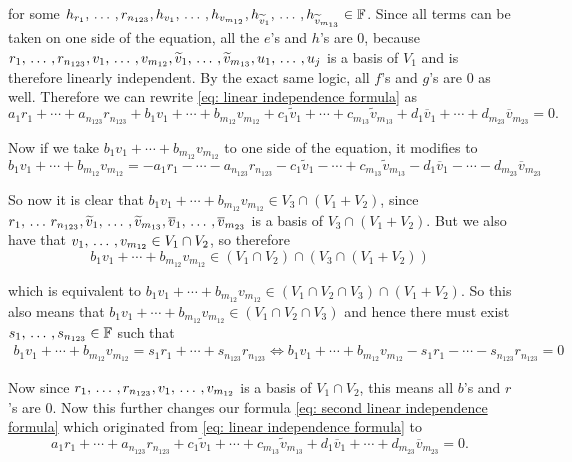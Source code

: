 \begin{xrcs}
  for some $h_{r_{1}}, {\, \ldots \,\,}, r_{n_{123}}, h_{v_{1}}, {\, \ldots \,\,}, h_{v_{m_{12}}}, h_{\widetilde{v}_1}, {\, \ldots \,\,},  h_{\widetilde{v}_{m_{13}}}  \in \mathbb{F}$. Since all terms can be taken on one side of the equation, all the $e$'s and $h$'s are $0$, because $r_1, {\, \ldots \,\,}, r_{n_{123}}, v_1, {\, \ldots \,\,}, v_{m_{12}}, \widetilde{v}_1, {\, \ldots \,\,}, \widetilde{v}_{m_{13}}, u_1, {\, \ldots \,\,}, u_j$ is a basis of $V_1$ and is therefore linearly independent. By the exact same logic, all $f$'s and $g$'s are $0$ as well. Therefore we can rewrite \eqref{eq: linear independence formula} as
  \begin{equation}
    \label{eq: second linear independence formula}
    a_1r_1 +  \cdots + a_{n_{123}} r_{n_{123}} + b_1v_1 +  \cdots + b_{m_{12}} v_{m_{12}} +  c_1\widetilde{v}_1 + \cdots + c_{m_{13}}\widetilde{v}_{m_{13}} + d_{1}\overline{v}_1 + \cdots + d_{m_{23}}\overline{v}_{m_{23}} = 0.
  \end{equation}


  Now if we take $b_1v_1 +  \cdots + b_{m_{12}} v_{m_{12}}$ to one side of the equation, it modifies to
  \[
  b_1v_1 +  \cdots + b_{m_{12}} v_{m_{12}} = -a_1r_1 -  \cdots - a_{n_{123}} r_{n_{123}} -   c_1\widetilde{v}_1 - \cdots + c_{m_{13}}\widetilde{v}_{m_{13}} - d_{1}\overline{v}_1 - \cdots - d_{m_{23}}\overline{v}_{m_{23}}
  \]

  So now it is clear that $b_1v_1 +  \cdots + b_{m_{12}} v_{m_{12}} \in V_3 \cap (V_1+V_2)$, since $r_1,  {\, \ldots \,\,} r_{n_{123}} ,  \widetilde{v}_1, {\, \ldots \,\,}, \widetilde{v}_{m_{13}}, \overline{v}_1, {\, \ldots \,\,}, \overline{v}_{m_{23}}$ is a basis of $V_3 \cap (V_1+V_2)$. But we also have that $v_1, {\, \ldots \,\,}, v_{m_{12}} \in V_1 \cap V_2$, so therefore
  \[
    b_1v_1 +  \cdots + b_{m_{12}} v_{m_{12}} \in (V_1 \cap V_2) \cap (V_3 \cap (V_1+V_2))
  \]

  which is equivalent to
  $
      b_1v_1 +  \cdots + b_{m_{12}} v_{m_{12}} \in (V_1 \cap V_2 \cap V_3) \cap (V_1+V_2).
  $
  So this also means that $b_1v_1 +  \cdots + b_{m_{12}} v_{m_{12}} \in (V_1 \cap V_2 \cap V_3)$ and hence there must exist $s_1, {\, \ldots \,\,}, s_{n_{123}} \in \mathbb{F}$ such that
  \begin{equation}
    \begin{aligned}
      b_1v_1 +  \cdots + b_{m_{12}} v_{m_{12}} = s_1 r_1 + \cdots + s_{n_{123}} r_{n_{123}} \iff
      b_1v_1 +  \cdots + b_{m_{12}} v_{m_{12}} - s_1 r_1 - \cdots - s_{n_{123}} r_{n_{123}} = 0
    \end{aligned}
  \end{equation}

  Now since $r_1, {\, \ldots \,\,}, r_{n_{123}}, v_1, {\, \ldots \,\,}, v_{m_{12}}$ is a basis of $V_1 \cap V_2$, this means all $b$'s and $r$'s are $0$. Now this further changes our formula \eqref{eq: second linear independence formula} which originated from \eqref{eq: linear independence formula} to
  \begin{equation}
    a_1r_1 +  \cdots + a_{n_{123}} r_{n_{123}} + c_1\widetilde{v}_1 + \cdots + c_{m_{13}}\widetilde{v}_{m_{13}} + d_{1}\overline{v}_1 + \cdots + d_{m_{23}}\overline{v}_{m_{23}} = 0.
  \end{equation}


\end{xrcs}

